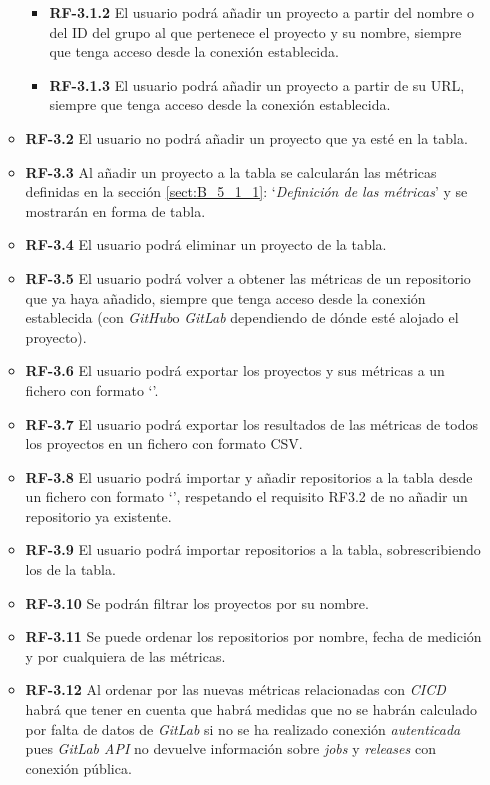 \begin{itemize}
\begin{itemize}
\begin{itemize}
			\item \textbf{RF-3.1.2} El usuario podrá añadir un proyecto a partir del nombre o del ID del grupo al que pertenece el proyecto y su nombre, siempre que tenga acceso desde la conexión establecida.
			\item \textbf{RF-3.1.3} El usuario podrá añadir un proyecto a partir de su URL, siempre que tenga acceso desde la conexión establecida.
		\end{itemize}
		\item \textbf{RF-3.2} El usuario no podrá añadir un proyecto que ya esté en la tabla.
		\item \textbf{RF-3.3} Al añadir un proyecto a la tabla se calcularán las métricas definidas en la sección \ref{sect:B_5_1_1}: `\textit{Definición de las métricas}' y se mostrarán en forma de tabla.
		\item \textbf{RF-3.4} El usuario podrá eliminar un proyecto de la tabla.
		\item \textbf{RF-3.5} El usuario podrá volver a obtener las métricas de un repositorio que ya haya añadido, siempre que tenga acceso desde la conexión establecida (con \textit{GitHub}o \textit{GitLab} dependiendo de dónde esté alojado el proyecto).
		\item \textbf{RF-3.6} El usuario podrá exportar los proyectos y sus métricas a un fichero con formato `'.
		\item \textbf{RF-3.7} El usuario podrá exportar los resultados de las métricas de todos los proyectos en un fichero con formato CSV.
		\item \textbf{RF-3.8} El usuario podrá importar y añadir repositorios a la tabla  desde un fichero con formato `', respetando el requisito RF3.2 de no añadir un repositorio ya existente.
		\item \textbf{RF-3.9} El usuario podrá importar repositorios a la tabla, sobrescribiendo los de la tabla.
		\item \textbf{RF-3.10} Se podrán filtrar los proyectos por su nombre.
		\item \textbf{RF-3.11} Se puede ordenar los repositorios por nombre, fecha de medición y por cualquiera de las métricas.
		\item \textbf{RF-3.12} Al ordenar por las nuevas métricas relacionadas con \textit{CICD} habrá que tener en cuenta que habrá medidas que no se habrán calculado por falta de datos de \textit{GitLab} si no se ha realizado conexión \textit{autenticada} pues \textit{GitLab API} no devuelve información  sobre \textit{jobs} y \textit{releases} con conexión pública.

\end{itemize}
\end{itemize}
